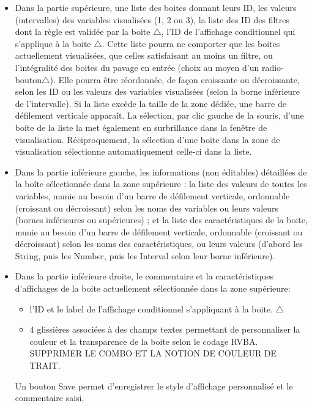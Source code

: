 \documentclass[a4paper]{article}
\begin{document}
\begin{itemize}
\item Dans la partie supérieure, une liste des boites donnant leurs ID, les valeurs (intervalles) des variables visualisées (1, 2 ou 3), la liste des ID des filtres dont la règle est validée par la boite $\triangle$, l'ID de l'affichage conditionnel qui s'applique à la boite $\triangle$. Cette liste pourra ne comporter que les boites actuellement visualisées, que celles satisfaisant au moins un filtre, ou l'intégralité des boites du pavage en entrée (choix au moyen d'un radio-bouton$\triangle$). Elle pourra être réordonnée, de façon croissante ou décroissante, selon les ID ou les valeurs des variables visualisées (selon la borne inférieure de l'intervalle). Si la liste excède la taille de la zone dédiée, une barre de défilement verticale apparaît. La sélection, par clic gauche de la souris, d'une boite de la liste la met également en surbrillance dans la fenêtre de visualisation. Réciproquement, la sélection d'une boite dans la zone de visualisation sélectionne automatiquement celle-ci dans la liste.
\item Dans la partie inférieure gauche, les informations (non éditables) détaillées de la boîte sélectionnée dans la zone supérieure : la liste des valeurs de toutes les variables, munie au besoin d'un barre de défilement verticale, ordonnable (croissant ou décroissant) selon les noms des variables ou leurs valeurs (bornes inférieures ou supérieures) ; et la liste des caractéristiques de la boite, munie au besoin d'un barre de défilement verticale, ordonnable (croissant ou décroissant) selon les noms des caractéristiques, ou leurs valeurs (d'abord les String, puis les Number, puis les Interval selon leur borne inférieure).
\item Dans la partie inférieure droite, le commentaire et la caractéristiques d'affichages de la boite actuellement sélectionnée dans la zone supérieure:
  \begin{itemize}
  \item l'ID et le label de l'affichage conditionnel s'appliquant à la boite. $\triangle$
  \item 4 glissières associées à des champs textes permettant de personnaliser la couleur et la transparence de la boite selon le codage RVBA.\\ SUPPRIMER LE COMBO ET LA NOTION DE COULEUR DE TRAIT.
  \end{itemize}
Un bouton Save permet d'enregistrer le style d'affichage personnalisé et le commentaire saisi.
\end{itemize}
\end{document}

